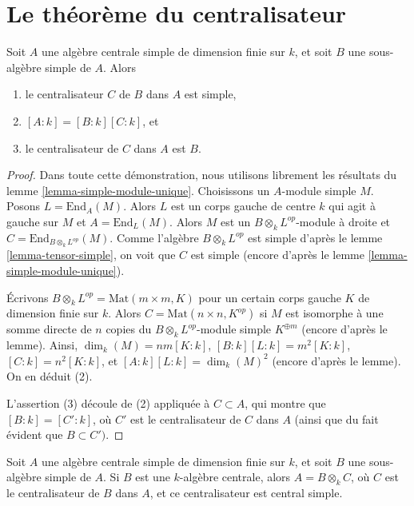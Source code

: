 \section{Le théorème du centralisateur}
\label{section-centralizer}


\begin{theorem}
\label{theorem-centralizer}
Soit $A$ une algèbre centrale simple de dimension finie sur $k$, et soit
$B$ une sous-algèbre simple de $A$. Alors
\begin{enumerate}
\item le centralisateur $C$ de $B$ dans $A$ est simple,
\item $[A : k] = [B : k][C : k]$, et
\item le centralisateur de $C$ dans $A$ est $B$.
\end{enumerate}
\end{theorem}

\begin{proof}
Dans toute cette démonstration, nous utilisons librement les résultats du
lemme \ref{lemma-simple-module-unique}.
Choisissons un $A$-module simple $M$. Posons $L = \text{End}_A(M)$.
Alors $L$ est un corps gauche de centre $k$ qui agit à gauche sur $M$
et $A = \text{End}_L(M)$.
Alors $M$ est un $B \otimes_k L^{op}$-module à droite et
$C = \text{End}_{B \otimes_k L^{op}}(M)$.
Comme l'algèbre $B \otimes_k L^{op}$ est simple d'après le
lemme \ref{lemma-tensor-simple}, on voit que $C$ est simple (encore d'après le
lemme \ref{lemma-simple-module-unique}).

\medskip\noindent
Écrivons $B \otimes_k L^{op} = \text{Mat}(m \times m, K)$ pour un certain
corps gauche $K$ de dimension finie sur $k$. Alors $C = \text{Mat}(n \times n, K^{op})$
si $M$ est isomorphe à une somme directe de $n$ copies du
$B \otimes_k L^{op}$-module simple $K^{\oplus m}$ (encore d'après le lemme). Ainsi,
$\dim_k(M) = nm [K : k]$, $[B : k] [L : k] = m^2 [K : k]$,
$[C : k] = n^2 [K : k]$, et $[A : k] [L : k] = \dim_k(M)^2$ (encore d'après
le lemme). On en déduit (2).

\medskip\noindent
L'assertion (3) découle de (2) appliquée à $C \subset A$, qui montre
que $[B : k] = [C' : k]$, où $C'$ est le centralisateur de $C$ dans $A$
(ainsi que du fait évident que $B \subset C')$.
\end{proof}

\begin{lemma}
\label{lemma-when-tensor-is-equal}
Soit $A$ une algèbre centrale simple de dimension finie sur $k$, et soit
$B$ une sous-algèbre simple de $A$. Si $B$ est une
$k$-algèbre centrale, alors $A = B \otimes_k C$, où $C$ est le centralisateur
de $B$ dans $A$, et ce centralisateur est central simple.
\end{lemma}

